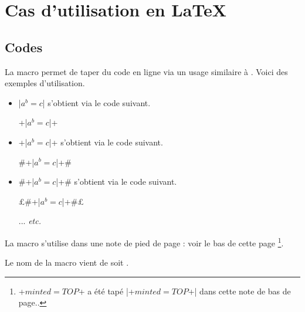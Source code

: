 \documentclass[10pt, a4paper]{article}
\begin{document}
\section{Cas d'utilisation en \LaTeX}

\subsection{Codes }

La macro  permet de taper du code en ligne via un usage similaire à .
Voici des exemples d'utilisation.
\begin{itemize}
    \item \bdocinlatex|$a^b = c$| s'obtient via le code suivant.
		  \begin{center}
		  		\bdocinlatex+\bdocinlatex|$a^b = c$|+
		  \end{center}


    \item \bdocinlatex+\bdocinlatex|$a^b = c$|+ s'obtient via le code suivant.
		  \begin{center}
		  		\bdocinlatex#\bdocinlatex+\bdocinlatex|$a^b = c$|+#
		  \end{center}
          

    \item \bdocinlatex#\bdocinlatex+\bdocinlatex|$a^b = c$|+# s'obtient via le code suivant.
		  \begin{center}
		  		\bdocinlatex£\bdocinlatex#\bdocinlatex+\bdocinlatex|$a^b = c$|+#£
				
				\medskip
				
				... \emph{etc.}
		  \end{center}
\end{itemize}


\begin{bdocimportant}
    La macro  s'utilise dans une note de pied de page : voir le bas de cette page
    \footnote{
        \bdocinlatex+$minted = TOP$+ a été tapé \bdocinlatex|\bdocinlatex+$minted = TOP$+| dans cette note de bas de page..
    }.
\end{bdocimportant}


\begin{bdocrem}
    Le nom de la macro  vient de  soit .
\end{bdocrem}


\end{document}
